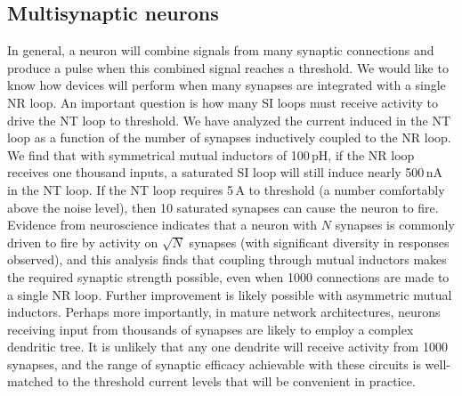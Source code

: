 \documentclass[twocolumn]{article}
\begin{document}
\subsection{\label{sec:scaling}Multisynaptic neurons} 
In general, a neuron will combine signals from many synaptic connections and produce a pulse when this combined signal reaches a threshold. We would like to know how devices will perform when many synapses are integrated with a single NR loop. An important question is how many SI loops must receive activity to drive the NT loop to threshold. We have analyzed the current induced in the NT loop as a function of the number of synapses inductively coupled to the NR loop. We find that with symmetrical mutual inductors of 100\,pH, if the NR loop receives one thousand inputs, a saturated SI loop will still induce nearly 500\,nA in the NT loop. If the NT loop requires 5\,\textmu A to threshold (a number comfortably above the noise level), then 10 saturated synapses can cause the neuron to fire. Evidence from neuroscience indicates that a neuron with $N$ synapses is commonly driven to fire by activity on $\sqrt{N}$ synapses \cite{vrso1996,vora2005} (with significant diversity in responses observed), and this analysis finds that coupling through mutual inductors makes the required synaptic strength possible, even when 1000 connections are made to a single NR loop. Further improvement is likely possible with asymmetric mutual inductors. Perhaps more importantly, in mature network architectures, neurons receiving input from thousands of synapses are likely to employ a complex dendritic tree. It is unlikely that any one dendrite will receive activity from 1000 synapses, and the range of synaptic efficacy achievable with these circuits is well-matched to the threshold current levels that will be convenient in practice. 
\end{document}
